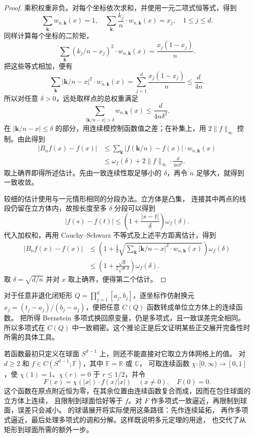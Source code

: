 \begin{proof}
乘积权重非负。对每个坐标依次求和，并使用一元二项式恒等式，得到
\[
 \sum_{\mathbf k}w_{n,\mathbf k}(x)=1,
 \quad
 \sum_{\mathbf k}\frac{k_j}{n}\cdot w_{n,\mathbf k}(x)=x_j,
 \quad 1\leq j\leq d.
\]
同样计算每个坐标的二阶矩，
\[
 \sum_{\mathbf k}(k_j/n-x_j)^2\cdot w_{n,\mathbf k}(x)
 =\frac{x_j(1-x_j)}n.
\]
把这些等式相加，便有
\[
 \sum_{\mathbf k}|\mathbf k/n-x|^2\cdot w_{n,\mathbf k}(x)
 =\sum_{j=1}^d\frac{x_j(1-x_j)}n
 \leq\frac d{4n}.
\]
所以对任意 \(\delta>0\)，远处取样点的总权重满足
\[
 \sum_{|\mathbf k/n-x|>\delta}w_{n,\mathbf k}(x)
 \leq\frac d{4n\delta^2}.
\]
在 \(|\mathbf k/n-x|\leq\delta\) 的部分，用连续模控制函数值之差；在补集上，用 \(2\lVert f\rVert_\infty\) 控制。由此得到
\[
\begin{aligned}
 |B_nf(x)-f(x)|
 &\leq\sum_{\mathbf k}|f(\mathbf k/n)-f(x)|\cdot w_{n,\mathbf k}(x)\\
 &\leq\omega_f(\delta)
       +2\lVert f\rVert_\infty\cdot\frac d{4n\delta^2}.
\end{aligned}
\]
取上确界即得所述估计。先由一致连续性取足够小的 \(\delta\)，再令 \(n\) 足够大，就得到一致收敛。

较细的估计使用与一元情形相同的分段办法。立方体是凸集，
连接其中两点的线段仍留在立方体内，故按长度至多 \(\delta\) 分段可以得到
\[
 |f(s)-f(t)|\leq\left(1+\frac{|s-t|}{\delta}\right)\omega_f(\delta).
\]
代入加权和，再用 Cauchy--Schwarz 不等式及上述平方距离估计，得到
\[
 \begin{aligned}
 |B_nf(x)-f(x)|
 &\leq\left(1+\frac1\delta
 \sqrt{\sum_{\mathbf k}|\mathbf k/n-x|^2\cdot w_{n,\mathbf k}(x)}\right)
 \omega_f(\delta)\\
 &\leq\left(1+\frac{\sqrt d}{2\sqrt n\,\delta}\right)\omega_f(\delta).
 \end{aligned}
\]
取 \(\delta=\sqrt{d/n}\) 并对 \(x\) 取上确界，便得第二个估计。
\end{proof}

对于任意非退化闭矩形 \(Q=\prod_{j=1}^d[a_j,b_j]\)，逐坐标作仿射换元
\(x_j=(t_j-a_j)/(b_j-a_j)\)，便把任意 \(C(Q)\) 函数转成单位立方体上的连续函数。
把所得 Bernstein 多项式换回原变量，仍是多项式，且一致误差完全相同。
所以多项式在 \(C(Q)\) 中一致稠密。这个推论正是后文证明某些正交展开完备性时所需的具体工具。

\ProseParagraphBreak
若函数最初只定义在球面 \(S^{d-1}\) 上，则还不能直接对它取立方体网格上的值。
对 \(d\geq2\) 和 \(f\in C(S^{d-1};\mathbb F)\)，其中 \(\mathbb F=\mathbb R\) 或 \(\mathbb C\)，
可取连续函数 \(\chi:[0,\infty)\to[0,1]\)，使
\(\chi(1)=1\)、\(\chi(r)=0\) 于 \(r\leq1/2\)，并令
\[
 F(x)=\chi(|x|)\cdot f(x/|x|)\quad(x\ne0),\quad F(0)=0.
\]
这个函数在原点附近恒为零，在其余位置由连续函数复合而成，因而在包住球面的立方体上连续，
且限制到球面恰好等于 \(f\)。对 \(F\) 作多项式一致逼近，再限制到球面，误差只会减小。
的球谐展开将实际使用这条路径：先作连续延拓，
再作多项式逼近，最后处理多项式的调和分解。这样既说明多元定理的用途，
也交代了从矩形到球面所需的额外一步。
